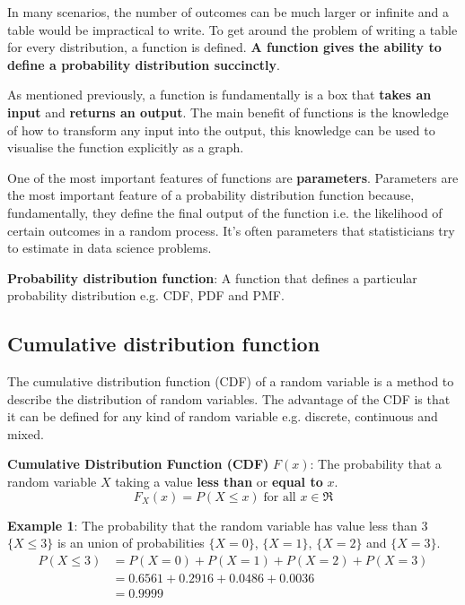 \documentclass[10pt,a4paper]{article}
\begin{document}
In many scenarios, the number of outcomes can be much larger or infinite and a table would be
impractical to write. To get around the problem of writing a table for every distribution, a
function is defined. \textbf{A function gives the ability to define a probability distribution succinctly}.

As mentioned previously, a function is fundamentally is a box that \textbf{takes an input} and
\textbf{returns an output}. The main benefit of functions is the knowledge of how to transform
any input into the output, this knowledge can be used to visualise the function explicitly as a
graph.

One of the most important features of functions are \textbf{parameters}. Parameters are the most
important feature of a probability distribution function because, fundamentally, they define the
final output of the function i.e. the likelihood of certain outcomes in a random process. It’s often
parameters that statisticians try to estimate in data science problems. 

\begin{tcolorbox}[breakable,colback=white]
    \textbf{Probability distribution function}: A function that defines a particular probability
    distribution e.g. CDF, PDF and PMF.
\end{tcolorbox}

\subsection{Cumulative distribution function}

The cumulative distribution function (CDF) of a random variable is a method to describe the
distribution of random variables. The advantage of the CDF is that it can be defined for any kind of
random variable e.g. discrete, continuous and mixed.

\begin{tcolorbox}[breakable,colback=white]
\textbf{Cumulative Distribution Function (CDF)} $F(x)$: The probability that a random variable $X$ taking a value \textbf{less than} or \textbf{equal to} $x$.
$$
    F_X(x) = P(X \leq x) \; \text{for all } x\in \Re 
$$
\end{tcolorbox}

\textbf{Example 1}: The probability that the random variable has value less than 3 $\{X \leq 3\}$ is
an union of probabilities $\{X=0\}$, $\{X=1\}$, $\{X=2\}$ and $\{X=3\}$.
\begin{align*}
    P(X\leq 3) &= P(X=0) + P(X=1) + P(X=2) + P(X=3) \\
    &= 0.6561 + 0.2916 + 0.0486 + 0.0036 \\
    &= 0.9999
\end{align*}
\end{document}
